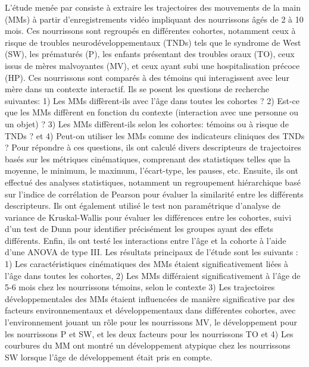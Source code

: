 \documentclass[8pt]{article}
\begin{document}
L'étude menée par \textcite{ouss_developmental_2018} consiste à extraire les trajectoires des mouvements de la main (MMs) à partir d'enregistrements vidéo impliquant des nourrissons âgés de 2 à 10 mois. Ces nourrissons sont regroupés en différentes cohortes, notamment ceux à risque de troubles neurodéveloppementaux (TNDs) tels que le syndrome de West (SW), les prématurés (P), les enfants présentant des troubles oraux (TO), ceux issus de mères malvoyantes (MV), et ceux ayant subi une hospitalisation précoce (HP). Ces nourrissons sont comparés à des témoins qui interagissent avec leur mère dans un contexte interactif. Ils se posent les questions de recherche suivantes: 1) Les MMs diffèrent-ils avec l'âge dans toutes les cohortes ? 2) Est-ce que les MMs diffèrent en fonction du contexte (interaction avec une personne ou un objet) ? 3) Les MMs diffèrent-ils selon les cohortes: témoins ou à risque de TNDs ? et 4) Peut-on utiliser les MMs comme des indicateurs cliniques des TNDs ? Pour répondre à ces questions, ils ont calculé divers descripteurs de trajectoires basés sur les métriques cinématiques, comprenant des statistiques telles que la moyenne, le minimum, le maximum, l'écart-type, les pauses, etc. Ensuite, ils ont effectué des analyses statistiques, notamment un regroupement hiérarchique basé sur l'indice de corrélation de Pearson pour évaluer la similarité entre les différents descripteurs. Ils ont également utilisé le test non paramétrique d'analyse de variance de Kruskal-Wallis pour évaluer les différences entre les cohortes, suivi d'un test de Dunn pour identifier précisément les groupes ayant des effets différents. Enfin, ils ont testé les interactions entre l'âge et la cohorte à l'aide d'une ANOVA de type III. Les résultats principaux de l'étude sont les suivants : 1) Les caractéristiques cinématiques des MMs étaient significativement liées à l'âge dans toutes les cohortes, 2) Les MMs différaient significativement à l'âge de 5-6 mois chez les nourrissons témoins, selon le contexte 3) Les trajectoires développementales des MMs étaient influencées de manière significative par des facteurs environnementaux et développementaux dans différentes cohortes, avec l'environnement jouant un rôle pour les nourrissons MV, le développement pour les nourrissons P et SW, et les deux facteurs pour les nourrissons TO et 4) Les courbures du MM ont montré un développement atypique chez les nourrissons SW lorsque l'âge de développement était pris en compte. 
\end{document}
